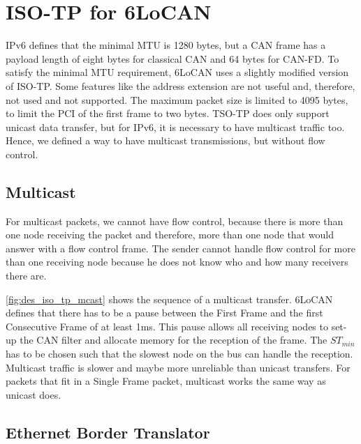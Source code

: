 \section{ISO-TP for 6LoCAN}
\label{sec:iso_tp_6LoCAN}

IPv6 defines that the minimal MTU is 1280 bytes, but a CAN frame has a payload length of eight bytes for classical CAN and 64 bytes for CAN-FD.
To satisfy the minimal MTU requirement, 6LoCAN uses a slightly modified version of ISO-TP.
Some features like the address extension are not useful and, therefore, not used and not supported.
The maximum packet size is limited to 4095 bytes, to limit the PCI of the first frame to two bytes.
TSO-TP does only support unicast data transfer, but for IPv6, it is necessary to have multicast traffic too.
Hence, we defined a way to have multicast transmissions, but without flow control.

\subsection{Multicast}
\label{sec:multicast_iso_tp}

For multicast packets, we cannot have flow control, because there is more than one node receiving the packet and therefore,
more than one node that would answer with a flow control frame.
The sender cannot handle flow control for more than one receiving node because he does not know who and how many receivers there are.



\autoref{fig:des_iso_tp_mcast} shows the sequence of a multicast transfer.
6LoCAN defines that there has to be a pause between the First Frame and the first Consecutive Frame of at least 1ms.
This pause allows all receiving nodes to set-up the CAN filter and allocate memory for the reception of the frame.
The $ST_{min}$ has to be chosen such that the slowest node on the bus can handle the reception.
Multicast traffic is slower and maybe more unreliable than unicast transfers.
For packets that fit in a Single Frame packet, multicast works the same way as unicast does.

\subsection{Ethernet Border Translator}
\label{sec:eth_border_translator}



